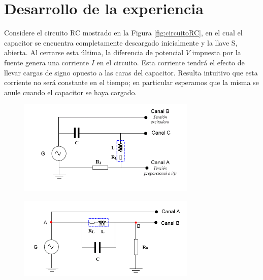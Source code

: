 \documentclass[laboratorio]{guia}
\begin{document}
 
\maketitle

\section{Desarrollo de la experiencia}

Considere el circuito RC mostrado en la Figura \ref{fig:circuitoRC}, en el
cual el capacitor se encuentra completamente descargado inicialmente y la
llave S, abierta. Al cerrarse esta \'ultima, la diferencia de potencial
$V$ impuesta por la fuente genera una corriente $I$ en el circuito. Esta 
corriente tendr\'a el efecto de llevar cargas de signo opuesto a las caras 
del capacitor. Resulta intuitivo que esta corriente no ser\'a constante en el tiempo; 
en particular esperamos que la misma se anule cuando el capacitor se haya
cargado. 


\begin{figure}[t!]
    \centering
    \includegraphics[width=8.5cm]{LG06--000.png}
    \caption{}
    \label{fig:1}
\end{figure}

\begin{figure}[t!]
    \centering
    \includegraphics[width=8.5cm]{LG06--001.png}
    \caption{}
    \label{fig:2}
\end{figure}


\nocite{Alonso1998,Purcell1988,Reitz1996,Trelles1984,Reitz1996}
 


%   
\end{document}
